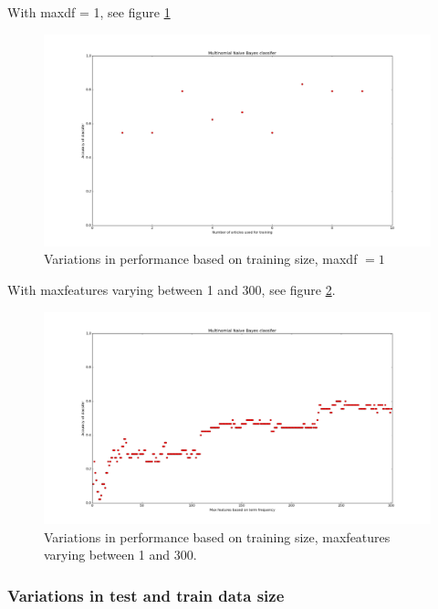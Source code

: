 \documentclass[a4paper,10pt]{article}
\begin{document}
\noindent With max\textunderscore df = 1, see figure \ref{fig:MNB_second}

\begin{figure}[h!]
  \centering
    \includegraphics[width=1.0\textwidth]{MNB_second}
  \caption{Variations in performance based on training size, max\textunderscore df $ = 1$}
  \label{fig:MNB_second}
\end{figure}

\noindent With max\textunderscore features varying between 1 and 300, see figure \ref{fig:MNB_third}.

\begin{figure}[h!]
  \centering
    \includegraphics[width=1.0\textwidth]{MNB_third}
  \caption{Variations in performance based on training size, max\textunderscore features varying between 1 and 300.}
  \label{fig:MNB_third}
\end{figure}

\subsubsection{Variations in test and train data size}
\end{document}
